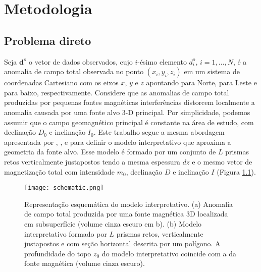 \chapter{Metodologia}

\section{Problema direto}

Seja $\mathbf{d}^{o}$ o vetor de dados observados, cujo $i$-ésimo elemento $d^{o}_{i}$, $i = 1, \dots, N$, é a anomalia de campo total observada no ponto $(x_{i}, y_{i}, z_{i})$ em um sistema de coordenadas Cartesiano com os eixos $x$, $y$ e $z$ apontando para Norte, para Leste e para baixo, respectivamente.
Considere que as anomalias de campo total produzidas por pequenas fontes magnéticas interferências distorcem localmente a anomalia causada por uma fonte alvo 3-D principal.
Por simplicidade, podemos assumir que o campo geomagnético principal é constante na área de estudo, com declinação $ D_ {0} $ e inclinação $ I_ {0} $.
Este trabalho segue a mesma abordagem apresentada por \cite{oliveirajr-etal2011}, \cite{oliveirajr-barbosa2013}, e \cite{vital_etal2019} para definir o modelo interpretativo que aproxima a geometria da fonte alvo.
Esse modelo é formado por um conjunto de $L$ prismas retos verticalmente justapostos tendo a mesma espessura $dz$ e o mesmo vetor de magnetização total com intensidade $m_{0}$, declinação $D$ e inclinação $I$ (Figura \ref{fig:schematic}).

\begin{figure}[!htb]
	\centering
	\texttt{[image: schematic.png]}
	\caption{Representação esquemática do modelo interpretativo. (a) Anomalia de campo total produzida por uma fonte magnética 3D localizada em subsuperfície (volume cinza escuro em b). (b) Modelo interpretativo formado por $ L $ prismas retos, verticalmente justapostos e com seção horizontal descrita por um polígono. A profundidade do topo $z_0$ do modelo interpretativo coincide com a da fonte magnética (volume cinza escuro).}
	\label{fig:schematic}
\end{figure}

